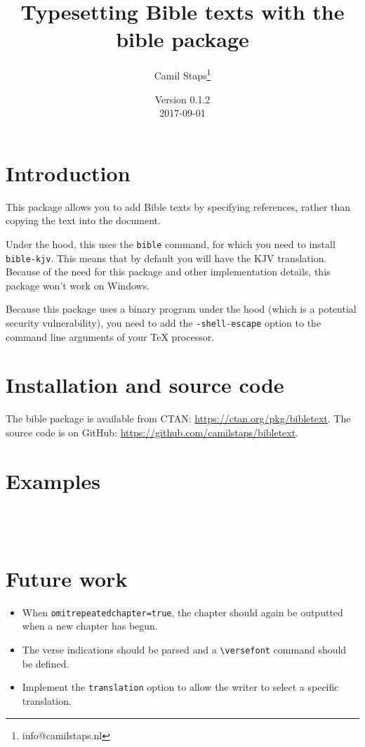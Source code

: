 \documentclass[a4paper]{ltxguide}
\title{Typesetting Bible texts with the \textsf{bible} package}
\author{Camil Staps\footnote{info@camilstaps.nl}}
\date{Version 0.1.2\\2017-09-01}
\newenvironment{example}
	{\VerbatimOut{\jobname.tmp}}
	{\endVerbatimOut%
		\begin{framed}
			\setlength{\parskip}{-10pt}
			\inputminted[gobble=8]{latex}{\jobname.tmp}
			\medskip
			
		\end{framed}}
\begin{document}
\maketitle

\section{Introduction}
This package allows you to add Bible texts by specifying references,
	rather than copying the text into the document.

Under the hood, this uses the \texttt{bible} command,
	for which you need to install \texttt{bible-kjv}.
This means that by default you will have the KJV translation.
Because of the need for this package and other implementation details,
	this package won't work on Windows.

Because this package uses a binary program under the hood
	(which is a potential security vulnerability),
	you need to add the \texttt{-shell-escape} option to the command line arguments of your TeX processor.

\section{Installation and source code}
The \textsf{bible} package is available from CTAN: \url{https://ctan.org/pkg/bibletext}.
The source code is on GitHub: \url{https://github.com/camilstaps/bibletext}.

\section{Examples}
\begin{example}
\end{example}

\begin{example}
\end{example}

\begin{example}
\end{example}

\begin{example}
\end{example}

\section{Future work}
\begin{itemize}
	\item When \verb$omitrepeatedchapter=true$,
		the chapter should again be outputted when a new chapter has begun.
	\item The verse indications should be parsed and a \verb$\versefont$ command should be defined.
	\item Implement the \verb$translation$ option to allow the writer to select a specific translation.
\end{itemize}
\end{document}
